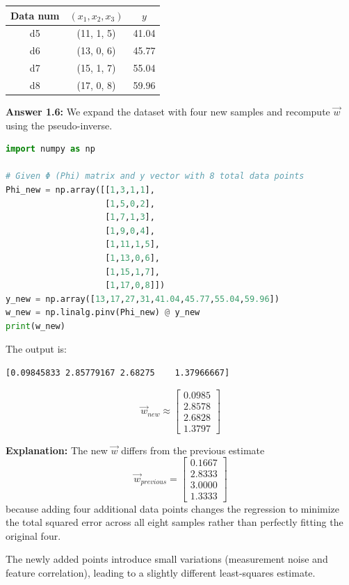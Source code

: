 \documentclass[12pt]{article}
\begin{document}
\begin{center}
\begin{tabular}{ccc}
\toprule
\textbf{Data num} & $(x_1, x_2, x_3)$ & $y$ \\
\midrule
d5 & (11, 1, 5) & 41.04 \\
d6 & (13, 0, 6) & 45.77 \\
d7 & (15, 1, 7) & 55.04 \\
d8 & (17, 0, 8) & 59.96 \\
\bottomrule
\end{tabular}
\end{center}
\textbf{Answer 1.6:}  
We expand the dataset with four new samples and recompute $\vec{w}$ using the pseudo-inverse.

\begin{lstlisting}[language=Python]
import numpy as np

# Given Φ (Phi) matrix and y vector with 8 total data points
Phi_new = np.array([[1,3,1,1],
                    [1,5,0,2],
                    [1,7,1,3],
                    [1,9,0,4],
                    [1,11,1,5],
                    [1,13,0,6],
                    [1,15,1,7],
                    [1,17,0,8]])
y_new = np.array([13,17,27,31,41.04,45.77,55.04,59.96])
w_new = np.linalg.pinv(Phi_new) @ y_new
print(w_new)
\end{lstlisting}

\noindent
The output is:
\begin{lstlisting}
[0.09845833 2.85779167 2.68275    1.37966667]
\end{lstlisting}

\[
\boxed{
\vec{w}_{new} \approx
\begin{bmatrix}
0.0985\\
2.8578\\
2.6828\\
1.3797
\end{bmatrix}
}
\]

\textbf{Explanation:}  
The new $\vec{w}$ differs from the previous estimate 
\[
\vec{w}_{previous} =
\begin{bmatrix}
0.1667\\
2.8333\\
3.0000\\
1.3333
\end{bmatrix}
\]
because adding four additional data points changes the regression to minimize the total squared error across all eight samples rather than perfectly fitting the original four.  

The newly added points introduce small variations (measurement noise and feature correlation), leading to a slightly different least-squares estimate.  
\end{document}
